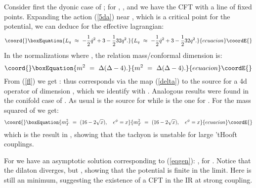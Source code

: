 \documentclass[a4paper,12pt]{article}
\def\half{{1 \over 2}}
\begin{document}
Consider first the dyonic case of \cite{kt1}; for \coordHE{}, \coordHE{}, \coordHE{} and we have
the \coordHE{} CFT with a line of fixed points.
Expanding the action (\ref{5da}) near \coordHE{}, which is a critical point for the potential,  we can deduce for \coordHE{} the effective lagrangian:
\begin{equation}\coord{}\boxEquation{
L_{q}~\approx~ -\half{\dot q}^2 +3 -{\half 32}{q}^2.
\label{fl}
}{
L_{q}~\approx~ -\half{\dot q}^2 +3 -{\half 32}{q}^2.
}{ecuacion}\coordE{}\end{equation}
In the normalizations where \coordHE{}, the relation mass/conformal dimension is:
\begin{equation}\coord{}\boxEquation{
m^2~=~\Delta(\Delta - 4).
\label{delta}
}{
m^2~=~\Delta(\Delta - 4).
}{ecuacion}\coordE{}\end{equation}
From (\ref{fl}) we get \coordHE{}: thus \coordHE{} corresponds via the \coordHE{} map (\ref{delta}) to the source for a 4d operator of dimension \coordHE{}, which we 
identify with \coordHE{}. Analogous results were found in the conifold case of \cite{bgz}.
As usual \cite{k} \myHighlight{$\phi$}\coordHE{} is the source for \coordHE{} while \coordHE{} 
is the one for \coordHE{}. For the mass squared of \coordHE{} we get:
\begin{equation}\coord{}\boxEquation{
m^2_T~=~ (16 -2{\sqrt x}),\quad  e^\phi= x
}{
m^2_T~=~ (16 -2{\sqrt x}),\quad  e^\phi= x
}{ecuacion}\coordE{}\end{equation}
which is the result in \cite{k}, showing that the tachyon is unstable for large
'tHooft couplings.

For \coordHE{} we have an asymptotic solution corresponding to (\ref{eqgen}): 
\myHighlight{$\phi \approx 2 \log |\tau|$}\coordHE{}, \coordHE{} for \myHighlight{$\tau\rightarrow -\infty$}\coordHE{}. 
Notice that the dilaton diverges, but \myHighlight{$ T^2 exp(\half\phi -5q)\rightarrow 0$}\coordHE{}, showing that the potential is finite in the limit. Here \coordHE{} is still an \coordHE{} minimum, suggesting the existence of a CFT in the IR at strong coupling.
\end{document}
